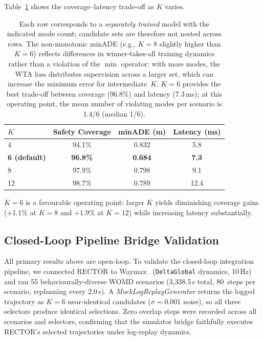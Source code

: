 Table~\ref{tab:k_sensitivity} shows the coverage--latency trade-off as $K$ varies.

\begin{table}[t]
\centering
\caption{Effect of Number of Modes K on Coverage and Efficiency}
\label{tab:k_sensitivity}
\begin{tabular}{lccc}
\toprule
\textbf{$K$} & \textbf{Safety Coverage} & \textbf{minADE (m)} & \textbf{Latency (ms)} \\
\midrule
4 & 94.1\% & 0.832 & 5.8 \\
\textbf{6 (default)} & \textbf{96.8\%} & \textbf{0.684} & \textbf{7.3} \\
8 & 97.9\% & 0.798 & 9.1 \\
12 & 98.7\% & 0.789 & 12.4 \\
\bottomrule
\end{tabular}
\vspace{1mm} \caption*{\footnotesize Each row corresponds to a \emph{separately trained} model with the indicated mode count; candidate sets are therefore not nested across rows.  The non-monotonic minADE (e.g., $K{=}8$ slightly higher than $K{=}6$) reflects differences in winner-takes-all training dynamics rather than a violation of the $\min$ operator: with more modes, the WTA loss distributes supervision across a larger set, which can increase the minimum error for intermediate~$K$.  $K{=}6$ provides the best trade-off between coverage (96.8\%) and latency (7.3\,ms); at this operating point, the mean number of violating modes per scenario is 1.4/6 (median 1/6).}
\end{table}

\noindent
$K{=}6$ is a favourable operating point: larger $K$ yields diminishing coverage gains (+1.1\% at $K{=}8$ and +1.9\% at $K{=}12$) while increasing
latency substantially.

\subsection{Closed-Loop Pipeline Bridge Validation}
\label{subsec:closed_loop}

All primary results above are open-loop.  To validate the closed-loop integration pipeline, we connected RECTOR to Waymax~\cite{gulino2024waymax} (\texttt{DeltaGlobal} dynamics, 10\,Hz) and ran 55 behaviourally-diverse WOMD scenarios (3{,}338.5\,s total, 80~steps per scenario, replanning every 2.0\,s).  A \emph{MockLogReplayGenerator} returns the logged trajectory as $K{=}6$ near-identical candidates ($\sigma{=}0.001$ noise), so all three selectors produce identical selections.  Zero overlap steps were recorded across all scenarios and selectors, confirming that the simulator bridge faithfully executes RECTOR's selected trajectories under log-replay dynamics.
